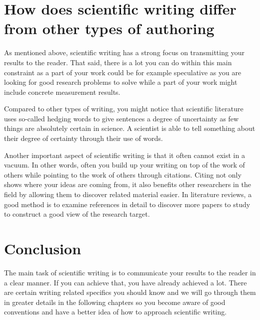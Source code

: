 \section{How does scientific writing differ from other types of authoring}

As mentioned above, scientific writing has a strong focus on transmitting your results to the reader. That said, there is a lot you can do within this main constraint as a part of your work could be for example speculative as you are looking for good research problems to solve while a part of your work might include concrete measurement results.

Compared to other types of writing, you might notice that scientific literature uses so-called hedging words to give sentences a degree of uncertainty as few things are absolutely certain in science. A scientist is able to tell something about their degree of certainty through their use of words.

Another important aspect of scientific writing is that it often cannot exist in a vacuum. In other words, often you build up your writing on top of the work of others while pointing to the work of others through citations. Citing not only shows where your ideas are coming from, it also benefits other researchers in the field by allowing them to discover related material easier. In literature reviews, a good method is to examine references in detail to discover more papers to study to construct a good view of the research target.

\section{Conclusion}

The main task of scientific writing is to communicate your results to the reader in a clear manner. If you can achieve that, you have already achieved a lot. There are certain writing related specifics you should know and we will go through them in greater details in the following chapters so you become aware of good conventions and have a better idea of how to approach scientific writing.
